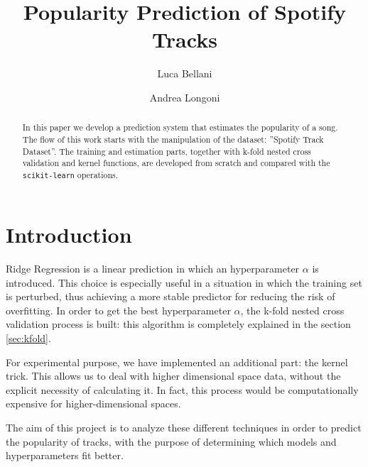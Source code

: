 \documentclass{article}
\begin{document}
\title{\textbf{Popularity Prediction of Spotify Tracks}}
\author{Luca Bellani}
\author{Andrea Longoni}
\date{}

\maketitle


\begin{abstract}
	In this paper we develop a prediction system that estimates the popularity of a song. The flow of this work starts with the manipulation of the dataset: ''Spotify Track Dataset''. The training and estimation parts, together with k-fold nested cross validation and kernel functions, are developed from scratch and compared with the \texttt{scikit-learn} operations. 
\end{abstract}
    

\section{Introduction}
Ridge Regression is a linear prediction in which an hyperparameter $\alpha$ is introduced. This choice is especially useful in a situation in which the training set is perturbed, thus achieving a more stable predictor for reducing the risk of overfitting. \newline
In order to get the best hyperparameter $\alpha$, the k-fold nested cross validation process is built: this algorithm is completely explained in the section \ref{sec:kfold}.

For experimental purpose, we have implemented an additional part: the kernel trick. This allows us to deal with higher dimensional space data, without the explicit necessity of calculating it. In fact, this process would be computationally expensive for higher-dimensional spaces.\newline
    
The aim of this project is to analyze these different techniques in order to predict the popularity of tracks, with the purpose of determining which models and hyperparameters fit better. 
     
\end{document}
